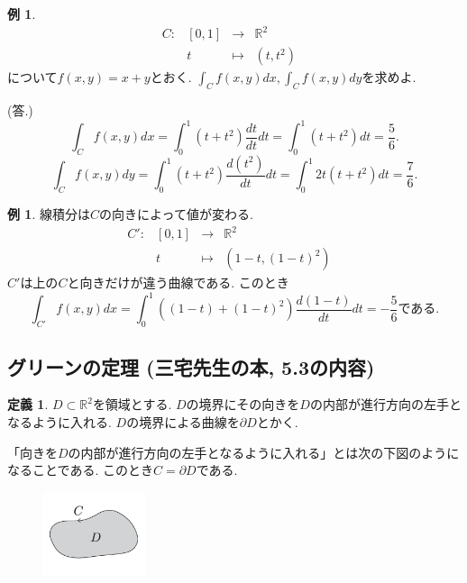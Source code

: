 \documentclass[dvipdfmx,a4paper,11pt]{article}
\newcommand{\R}{\mathbb{R}}
\theoremstyle{definition}
\newtheorem{dfn}[thm]{定義}
\newtheorem{exa}[thm]{例}
\begin{document}
 \begin{exa}
 $$
\begin{array}{ccccc}
C: &[0,1] & \rightarrow & \R^2 & \\
&t & \longmapsto &(t, t^2)&
\end{array}
$$
について$f(x,y)=x+y$とおく. $\int_{C}f(x,y)dx,\int_{C}f(x,y)dy$を求めよ.

\hspace{-18pt} (答.) 
$$
\int_{C}f(x,y)dx = \int_{0}^{1}(t+t^2) \frac{dt}{dt}dt = \int_{0}^{1}(t+t^2) dt =\frac{5}{6}.
$$
$$
\int_{C}f(x,y)dy = \int_{0}^{1}(t+t^2) \frac{d(t^2)}{dt}dt = \int_{0}^{1}2t(t+t^2) dt =\frac{7}{6}.
$$
 \end{exa}
 
 
  \begin{exa} 線積分は$C$の向きによって値が変わる. 
 $$
\begin{array}{ccccc}
C': &[0,1] & \rightarrow & \R^2 & \\
&t & \longmapsto &(1-t, (1-t)^2)&
\end{array}
$$
$C'$は上の$C$と向きだけが違う曲線である.
このとき
$$
\int_{C'}f(x,y)dx = \int_{0}^{1}((1-t)+(1-t)^2) \frac{d(1-t)}{dt}dt = -\frac{5}{6} \text{である.}
$$
 \end{exa}

\subsection{グリーンの定理  (三宅先生の本, 5.3の内容)}
   \begin{tcolorbox}[
    colback = white,
    colframe = green!35!black,
    fonttitle = \bfseries,
    breakable = true]
    \begin{dfn}
$D \subset \R^2$を領域とする. $D$の境界にその向きを$D$の内部が進行方向の左手となるように入れる. $D$の境界による曲線を$\partial D$とかく.
      \end{dfn}
    \end{tcolorbox}
    
 「向きを$D$の内部が進行方向の左手となるように入れる」とは次の下図のようになることである. このとき$C=\partial D$である.
\begin{figure}[htbp]
\begin{center}
 \includegraphics[height=25mm, width=30mm]{green.jpg}
\end{center}
\end{figure}
\end{document}
